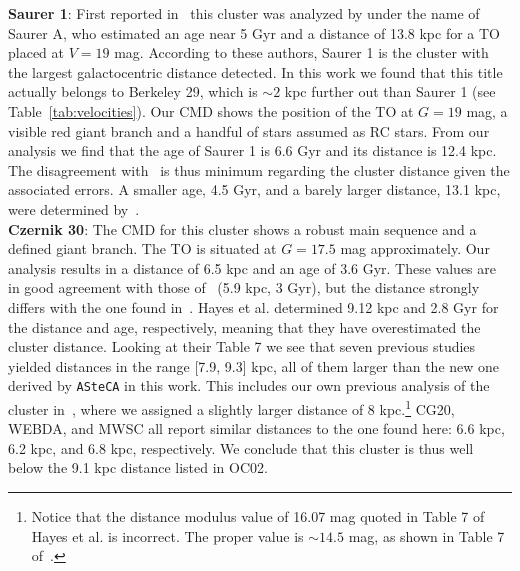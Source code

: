 \documentclass{aa}
\begin{document}
\begin{appendix}
  \noindent \textbf{Saurer 1}: First reported in~\citet[][along with Saurer 3 and Saurer 6]
  {Saurer_1994} this cluster was analyzed by \cite{Carraro_2003} under
  the name of Saurer A, who estimated an age near 5 Gyr and a distance of 13.8
  kpc for a TO placed at $V=19$ mag. According to these authors, Saurer 1 is the
  cluster with the largest galactocentric distance detected. In this work we
  found that this title actually belongs to Berkeley 29, which is $\sim2$
  kpc further out than Saurer 1 (see Table~\ref{tab:velocities}).
  Our CMD shows the position of the TO at $G=19$ mag, a visible red giant
  branch and a handful of stars assumed as RC stars. From our analysis we find
  that the age of Saurer 1 is 6.6 Gyr and its distance is 12.4 kpc. The
  disagreement with~\cite{Carraro_2003} is thus minimum regarding the
  cluster distance given the associated errors. A smaller age, 4.5 Gyr, and
  a barely larger distance, 13.1 kpc, were determined
  by~\cite{Frinchaboy_2006}.\\

  \noindent \textbf{Czernik 30}: The CMD for this cluster shows a robust main sequence
  and a defined giant branch. The TO is situated at $G=17.5$ mag approximately.
  Our analysis results in a distance of 6.5 kpc and an age of 3.6 Gyr. These
  values are in good agreement with those of~\cite{Dias_2021} (5.9 kpc, 3 Gyr),
  but the distance strongly differs with the one found in~\cite{Hayes_2015}.
  Hayes et al. determined 9.12 kpc and 2.8 Gyr for the distance and age,
  respectively, meaning that they have overestimated the cluster distance.
  Looking at their Table 7 we see that seven previous studies yielded distances
  in the range [7.9, 9.3] kpc, all of them larger than the new one derived by
  \texttt{ASteCA} in this work. This includes our own previous analysis of the
  cluster in~\cite{Perren_2015}, where we assigned a slightly larger distance of
  8 kpc.\footnote{Notice that the distance modulus value of 16.07 mag quoted in
  Table 7 of Hayes et al. is incorrect. The proper value is $\sim14.5$ mag, as
  shown in Table 7 of~\cite{Perren_2015}.}
  CG20, WEBDA, and MWSC all report similar distances to the one found here:
  6.6 kpc, 6.2 kpc, and 6.8 kpc, respectively. We conclude that this cluster
  is thus well below the 9.1 kpc distance listed in OC02.\\


\end{appendix}
\end{document}
